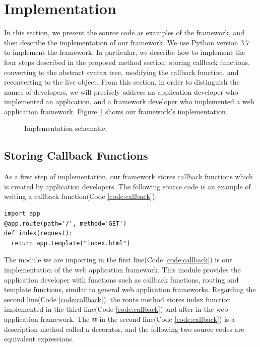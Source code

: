 \documentclass[conference]{IEEEtran}
\begin{document}
\section{Implementation}
In this section, we present the source code as examples of the framework, and then describe the implementation of our framework. We use Python version 3.7 to implement the framework.
In particular, we describe how to implement the four steps described in the proposed method section: storing callback functions, converting to the abstract syntax tree, modifying the callback function, and reconverting to the live object.
From this section, in order to distinguish the names of developers, we will precisely address an application developer who implemented an application, and a framework developer who implemented a web application framework.
Figure \ref{fig:implementation_schematic} shows our framework's implementation.
\begin{figure}[htbp]
\caption{Implementation schematic.}
\label{fig:implementation_schematic}
\end{figure}

\subsection{Storing Callback Functions}
As a first step of implementation, our framework stores callback functions which is created by application developers.
The following source code is an example of writing a callback function(Code \ref{code:callback}).

\begin{lstlisting}[caption={An example of a callback function.}, label=code:callback, captionpos=b]
import app
@app.route(path='/', method='GET')
def index(request):
  return app.template("index.html")
\end{lstlisting}
The module we are importing in the first line(Code \ref{code:callback}) is our implementation of the web application framework.
This module provides the application developer with functions such as callback functions, routing and template functions, similar to general web application frameworks.
Regarding the second line(Code \ref{code:callback}), the route method stores index function implemented in the third line(Code \ref{code:callback}) and after in the web application framework.
The @ in the second line(Code \ref{code:callback}) is a description method called a decorator, and the following two source codes are equivalent expressions.
\end{document}
